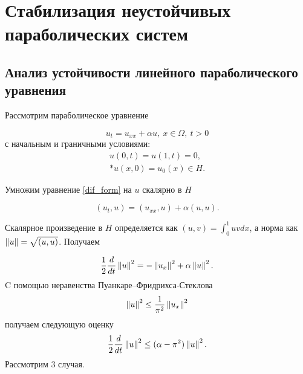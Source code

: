 \chapter{Стабилизация неустойчивых параболических систем}


\section{Анализ устойчивости линейного параболического уравнения}

Рассмотрим параболическое уравнение

\begin{equation}\label{dif_form}
    u_t = u_{xx} + \alpha u, \ x \in \Omega, \ t > 0
\end{equation}
с начальным и граничными условиями:
\begin{gather}\label{d_control}
    u(0, t) = u(1, t) = 0, \\*
    u(x, 0) = u_{0}(x) \in H. \nonumber
\end{gather}

Умножим уравнение \eqref{dif_form} на $u$ скалярно в $H$

\begin{equation*}
    (u_t, u) = (u_{xx}, u) + \alpha (u, u).
\end{equation*}

Скалярное произведение в $H$ определяется как $(u, v) = \int_0^1 uv dx$,
а норма как $\left\lVert u\right\rVert = \sqrt{(u, u)}$. Получаем

\begin{equation}\label{int_form}
    \frac{1}{2}\frac{d}{dt}\left\lVert u\right\rVert^2 = -\left\lVert u_x\right\rVert^2 + \alpha \left\lVert u\right\rVert^2.
\end{equation}
C помощью неравенства Пуанкаре–Фридрихса-Стеклова
\begin{equation*}
    \left\lVert u\right\rVert^2 \le \frac{1}{\pi^2} \left\lVert u_x\right\rVert^2
\end{equation*}
получаем следующую оценку 
\begin{equation}\label{stable_opr}
    \frac{1}{2}\frac{d}{dt}\left\lVert u\right\rVert^2 \le (\alpha - \pi^2)\left\lVert u\right\rVert^2.
\end{equation}
Рассмотрим 3 случая.

